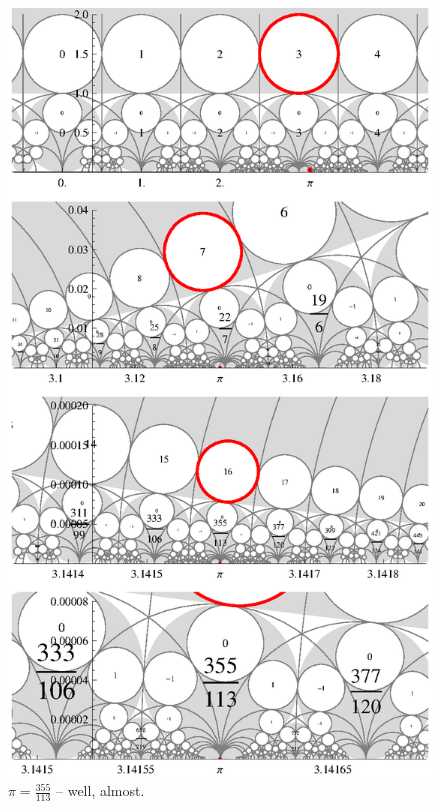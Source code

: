 \begin{figure}
\centering
\includegraphics[width=\textwidth]{figures/cont-frac-pi}
\caption{$\pi = \frac{355}{113}$ -- well, almost.}
\label{fig_ContFracPi}
\end{figure}


